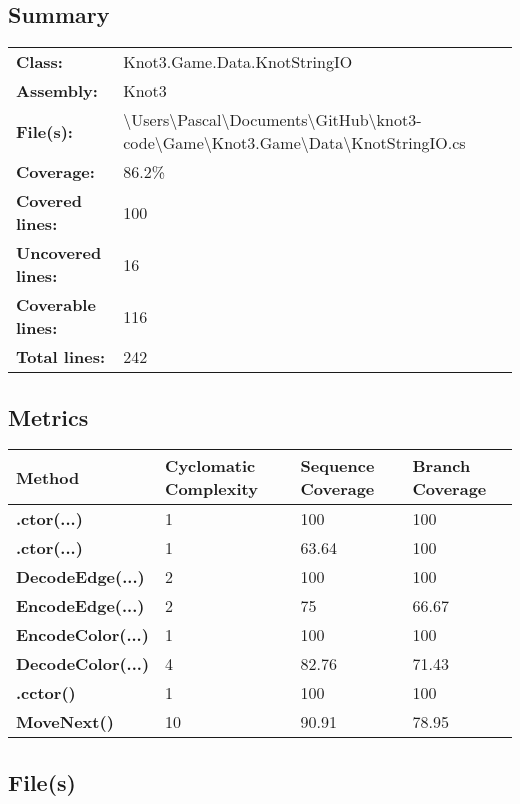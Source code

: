 \documentclass[a4paper,10pt]{article}
\begin{document}
\subsection{Summary}
\begin{longtable}[l]{ll}
\textbf{Class:} & Knot3.Game.Data.KnotStringIO\\
\textbf{Assembly:} & Knot3\\
\textbf{File(s):} & \begin{minipage}[t]{12cm}{\textbackslash Users\textbackslash Pascal\textbackslash Documents\textbackslash GitHub\textbackslash knot3-code\textbackslash Game\textbackslash Knot3.Game\textbackslash Data\textbackslash KnotStringIO.cs}\end{minipage} \\
\textbf{Coverage:} & 86.2\%\\
\textbf{Covered lines:} & 100\\
\textbf{Uncovered lines:} & 16\\
\textbf{Coverable lines:} & 116\\
\textbf{Total lines:} & 242\\
\end{longtable}
\subsection{Metrics}
\begin{longtable}[l]{|l|l|l|l|}
\hline
\textbf{Method} & \textbf{Cyclomatic Complexity} & \textbf{Sequence Coverage} & \textbf{Branch Coverage}\\
\hline
\textbf{.ctor(...)} & 1 & 100 & 100\\
\hline
\textbf{.ctor(...)} & 1 & 63.64 & 100\\
\hline
\textbf{DecodeEdge(...)} & 2 & 100 & 100\\
\hline
\textbf{EncodeEdge(...)} & 2 & 75 & 66.67\\
\hline
\textbf{EncodeColor(...)} & 1 & 100 & 100\\
\hline
\textbf{DecodeColor(...)} & 4 & 82.76 & 71.43\\
\hline
\textbf{.cctor()} & 1 & 100 & 100\\
\hline
\textbf{MoveNext()} & 10 & 90.91 & 78.95\\
\hline
\end{longtable}
\subsection{File(s)}
\end{document}
